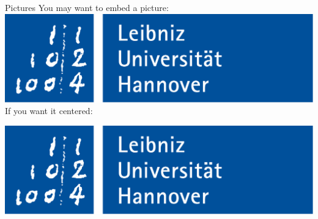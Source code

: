 \documentclass[aspectratio=169]{beamer}
\begin{document}
\begin{frame}{Pictures}
	You may want to embed a picture:\\
	\includegraphics[width=\textwidth]{sra.bg/luh-logo-rgb.pdf}\\
	If you want it centered:
	\begin{realcenter}
		\includegraphics[width=\textwidth]{sra.bg/luh-logo-rgb.pdf}
	\end{realcenter}
\end{frame}
\end{document}
